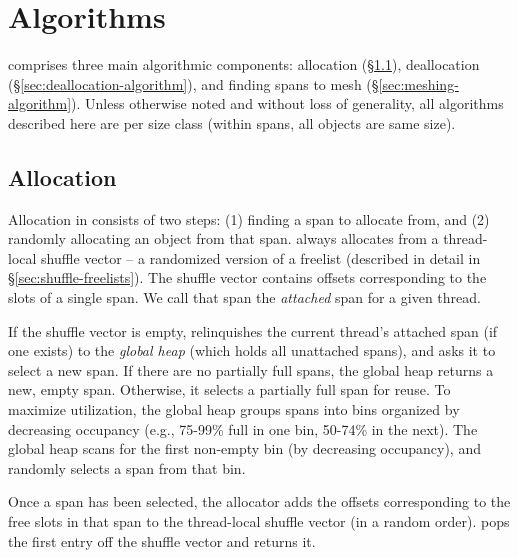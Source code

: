 \section{Algorithms}
\label{sec:algorithms}


\Mesh{} comprises three main algorithmic components: allocation
(\S\ref{sec:allocation-algorithm}), deallocation
(\S\ref{sec:deallocation-algorithm}), and finding spans to mesh
(\S\ref{sec:meshing-algorithm}). Unless otherwise noted and without
loss of generality, all algorithms described here are per size class
(within spans, all objects are same size).

\subsection{Allocation}
\label{sec:allocation-algorithm}

Allocation in \Mesh{} consists of two steps: (1) finding a span to
allocate from, and (2) randomly allocating an object from that span.
\Mesh{} always allocates from a thread-local shuffle vector -- a
randomized version of a freelist (described in detail in
\S\ref{sec:shuffle-freelists}). The shuffle vector contains offsets
corresponding to the slots of a single span.  We call that span the
\emph{attached} span for a given thread.

If the shuffle vector is empty, \Mesh relinquishes the current
thread's attached span (if one exists) to the \emph{global heap}
(which holds all unattached spans), and asks it to select a new
span. If there are no partially full spans, the global heap returns a
new, empty span.  Otherwise, it selects a partially full span for
reuse. To maximize utilization, the global heap groups spans into bins
organized by decreasing occupancy (e.g., 75-99\% full in one bin,
50-74\% in the next). The global heap scans for the first non-empty
bin (by decreasing occupancy), and randomly selects a span from that
bin.

Once a span has been selected, the allocator adds the offsets
corresponding to the free slots in that span to the thread-local
shuffle vector (in a random order). \Mesh{} pops the first entry off
the shuffle vector and returns it.


